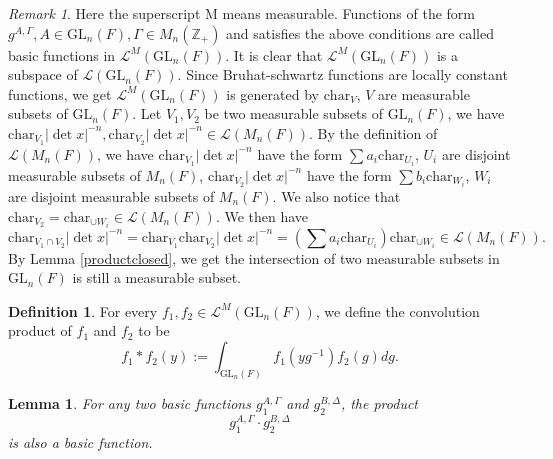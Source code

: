 \documentclass{amsart}
\newtheorem{lemma}[theorem]{Lemma}
\theoremstyle{definition}
\newtheorem{definition}[theorem]{Definition}
\theoremstyle{remark}
\newtheorem{remark}[theorem]{Remark}
\numberwithin{equation}{section}
\def  \Char     {\mathrm{char}}
\def  \GL        {\mathrm{GL}}
\def  \cl       {\mathcal{L}}
\def  \bz       {\mathbb{Z}}
\begin{document}
\begin{remark}\label{productsupport}
 Here the superscript M means measurable. Functions of the form $g^{A, \Gamma}, A \in \GL_n(F), \Gamma \in M_n(\bz_+)$   and satisfies  the above conditions are called basic functions in $\cl^{M}(\GL_n(F))$. It is clear that $\cl^{M}(\GL_n(F))$ is a  subspace of $\cl(\GL_n(F))$.   Since Bruhat-schwartz functions are locally constant functions,   we get $\cl^{M}(\GL_n(F))$ is generated by $\Char_V$, $V$ are  measurable subsets of $\GL_n(F)$.  Let $V_1, V_2$ be two measurable subsets of $\GL_n(F)$, we  have $\Char_{V_1} |\det x|^{-n},  \Char_{V_2}|\det x|^{-n}  \in \cl (M_n(F))$.  By the definition of $\cl(M_n(F))$, we have $\Char_{V_1}|\det x|^{-n}$  have the form $\sum a_i  \Char_{U_i}$, $U_i$ are disjoint measurable subsets of $ M_n(F)$,  $\Char_{V_2}|\det x|^{-n}$  have the form $\sum b_i  \Char_{W_i}$, $W_i$ are disjoint measurable subsets of $ M_n(F)$.   We also notice that $\Char_{V_2} = \Char_{\cup W_i}   \in \cl(M_n(F))$. We then have
 $$
 \Char_{V_1 \cap V_2} |\det x|^{-n}= \Char_{V_1}  \Char_{V_2}  |\det x|^{-n}=  (\sum a_i \Char_{U_i})\Char_{ \cup W_i}   \in \cl(M_n(F)).
 $$
By Lemma \ref{productclosed},  we get the intersection of two measurable subsets  in $\GL_n(F)$ is still a measurable subset.
\end{remark}



\begin{definition}
	For every $f_1,f_2  \in  \cl^M (\GL_n(F))$, we define the convolution product of $f_1$ and $f_2$ to be
	$$
	f_1* f_2(y):= \int_{\GL_n(F)} f_1(yg^{-1}) f_2(g) dg.
	$$
\end{definition}


\begin{lemma}\label{productclosedgln}
	  For any two basic functions $g_1^{A, \Gamma}$ and $g_2^{B, \Delta}$, the product
	  \[
	  g_1^{A, \Gamma} \cdot g_2^{B,  \Delta} 
	  \]
	  is also a basic function.
\end{lemma}
\end{document}
